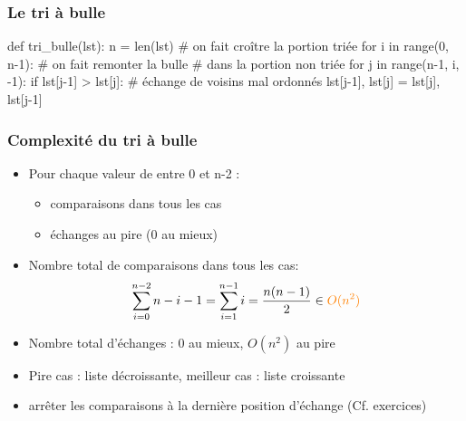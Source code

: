 \documentclass[12pt]{linfo-beamer}
\begin{document}

\begin{frame}[fragile]
 \frametitle{Le tri à bulle}

\small

\begin{pyframe}{}
def tri_bulle(lst):
    n = len(lst)
    # on fait croître la portion triée
    for i in range(0, n-1):
        # on fait remonter la bulle
        # dans la portion non triée
        for j in range(n-1, i, -1):
            if lst[j-1] > lst[j]:
                # échange de voisins mal ordonnés
                lst[j-1], lst[j] = lst[j], lst[j-1]
\end{pyframe}


\end{frame}


\begin{frame}
  \frametitle{Complexité du tri à bulle}

  \begin{itemize}
  \item Pour chaque valeur de  entre 0 et n-2 :
    \begin{itemize}
    \item {} comparaisons dans tous les cas
    \item  {} échanges au pire (0 au mieux)
    \end{itemize}
  \item Nombre total de comparaisons dans tous les cas:
    \[
    \sum_{i=0}^{n-2} n-i-1 = \sum_{i=1}^{n-1} i = \frac{n(n-1)}{2} \in {\color{orange} O(n^2)}
    \]
  \item Nombre total d'échanges : 0 au mieux, $O(n^2)$ au pire

  \item Pire cas : liste décroissante, meilleur cas : liste croissante

  \item {} arrêter les comparaisons à
    la dernière position d'échange (Cf. exercices)
  \end{itemize}
\end{frame}
\end{document}
